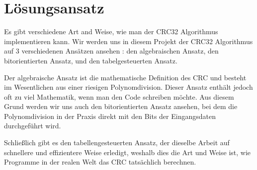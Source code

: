 \documentclass[course=erap]{aspdoc}
\begin{document}
\section{Lösungsansatz}

    Es gibt verschiedene Art and Weise, wie man der CRC32 Algorithmus implementieren kann. Wir werden uns in diesem Projekt der CRC32 Algorithmus auf 3 verschiedenen Ansätzen ansehen : den algebraischen Ansatz, den bitorientierten Ansatz, und den tabelgesteuerten Ansatz. 
    
    Der algebraische Ansatz ist die mathematische Definition des CRC und besteht im Wesentlichen aus einer riesigen Polynomdivision. Dieser Ansatz enthält jedoch oft zu viel Mathematik, wenn man den Code schreiben möchte. Aus diesem Grund werden wir uns auch den bitorientierten Ansatz ansehen, bei dem die Polynomdivision in der Praxis direkt mit den Bits der Eingangsdaten durchgeführt wird.
    
    Schließlich gibt es den tabellengesteuerten Ansatz, der dieselbe Arbeit auf schnellere und effizientere Weise erledigt, weshalb dies die Art und Weise ist, wie Programme in der realen Welt das CRC tatsächlich berechnen.\cite{stigge2006reversing}



 
\end{document}
